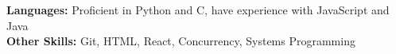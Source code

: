 

\begin{cvparagraph}
    \textbf{Languages:} Proficient in Python and C, have experience with JavaScript and Java \\
    \textbf{Other Skills:} Git, HTML, React, Concurrency, Systems Programming
\end{cvparagraph}
